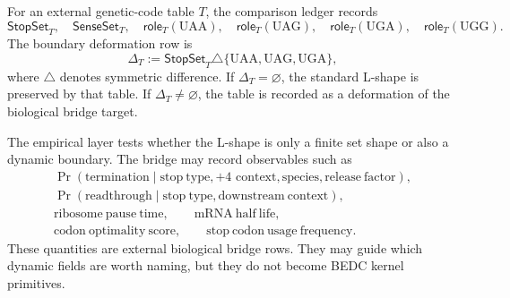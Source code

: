 \begin{definition}
\label{def:philosophy-comparative-genetic-code-deformation-ledger}
For an external genetic-code table $T$, the comparison ledger records
$$
  \mathsf{StopSet}_{T},\quad
  \mathsf{SenseSet}_{T},\quad
  \mathsf{role}_{T}(\mathrm{UAA}),\quad
  \mathsf{role}_{T}(\mathrm{UAG}),\quad
  \mathsf{role}_{T}(\mathrm{UGA}),\quad
  \mathsf{role}_{T}(\mathrm{UGG}).
$$
The boundary deformation row is
$$
  \Delta_{T}
  :=
  \mathsf{StopSet}_{T}
  \triangle
  \{\mathrm{UAA},\mathrm{UAG},\mathrm{UGA}\},
$$
where $\triangle$ denotes symmetric difference. If
$\Delta_{T}=\varnothing$, the standard L-shape is preserved by that
table. If $\Delta_{T}\neq\varnothing$, the table is recorded as a
deformation of the biological bridge target.
\end{definition}

\begin{definition}
\label{def:philosophy-empirical-dynamics-observables}
The empirical layer tests whether the L-shape is only a finite set
shape or also a dynamic boundary. The bridge may record observables such
as
$$
\begin{gathered}
  \Pr(\mathrm{termination}\mid
    \mathrm{stop\ type},+4\text{ context},\mathrm{species},
    \mathrm{release\ factor}),\\
  \Pr(\mathrm{readthrough}\mid
    \mathrm{stop\ type},\mathrm{downstream\ context}),\\
  \mathrm{ribosome\ pause\ time},\qquad
  \mathrm{mRNA\ half\ life},\\
  \mathrm{codon\ optimality\ score},\qquad
  \mathrm{stop\ codon\ usage\ frequency}.
\end{gathered}
$$
These quantities are external biological bridge rows. They may guide
which dynamic fields are worth naming, but they do not become BEDC
kernel primitives.
\end{definition}

